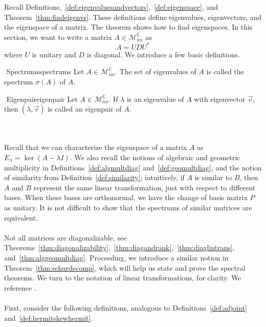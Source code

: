         Recall Definitions,~\ref{def:eigenvaluesandvectors},~\ref{def:eigenspace}, and Theorem~\ref{thm:findeigenvs}. These definitions define eigenvalues, eigenvectors, and the eigenspace of a matrix. The theorem shows how to find eigenspaces. In this section, we want to write a matrix \(A\in\mathcal{M}_{nn}^\mathbb{C}\) as
        \begin{equation*}
            A=UDU^*
        \end{equation*}
        where \(U\) is unitary and \(D\) is diagonal. We introduce a few basic definitions.
        \begin{definition}{\Stop\,\,Spectrums}{spectrums}
            Let \(A\in\mathcal{M}_{nn}^\mathbb{C}\). The set of eigenvalues of \(A\) is called the spectrum \(\sigma(A)\) of \(A\).
        \end{definition}
        \begin{definition}{\Stop\,\,Eigenpair}{eigenpair}
            Let \(A\in\mathcal{M}_{nn}^\mathbb{C}\). If \(\lambda\) is an eigenvalue of \(A\) with eigenvector \(\vec{v}\), then \((\lambda,\vec{v})\) is called an eigenpair of \(A\).
        \end{definition}
        \vphantom
        \\
        \\
        Recall that we can characterize the eigenspace of a matrix \(A\) as \(E_\lambda=\ker(A-\lambda I)\). We also recall the notions of algebraic and geometric multiplicity in Definitions~\ref{def:algmultdiag} and~\ref{def:geomultdiag}, and the notion of similarity from Definition~\ref{def:similarity}; intuitively, if \(A\) is similar to \(B\), then \(A\) and \(B\) represent the same linear transformation, just with respect to different bases. When these bases are orthonormal, we have the change of basis matrix \(P\) as unitary. It is not difficult to show that the spectrums of similar matrices are equivalent.
        \\
        \\
        Not all matrices are diagonalizable, see Theorems~\ref{thm:diagonalizability},~\ref{thm:diagandrank},~\ref{thm:diaglintrans}, and~\ref{thm:alggeomultdiag}. Proceeding, we introduce a similar notion in Theorem~\ref{thm:schurdecomp}, which will help us state and prove the spectral theorems. We turn to the notation of linear transformations, for clarity. We reference \cite{treil2017linear}.
        \\
        \\
        First, consider the following definitions, analogous to Definitions~\ref{def:adjoint} and~\ref{def:hermitskewhermit}.
